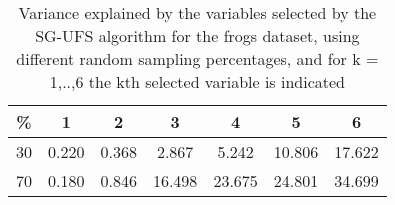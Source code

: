 \begin{table}
	\begin{center}
		\begin{tabular}{c c c c c c c}
			\% & 1 & 2 & 3 & 4 & 5 & 6 \\
			\hline
			30 & 0.220 & 0.368 & 2.867 & 5.242 & 10.806 & 17.622 \\
			70 & 0.180 & 0.846 & 16.498 & 23.675 & 24.801 & 34.699 \\
		\end{tabular}
	\end{center}
	\caption{Variance explained by the variables selected by the SG-UFS algorithm for the frogs dataset, using different random sampling percentages, and for k = 1,..,6 the kth selected variable is indicated}
\end{table}